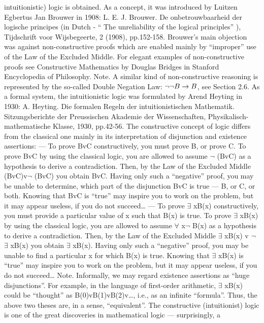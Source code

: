 intuitionistic) logic is obtained. As a concept, it was introduced by Luitzen Egbertus Jan Brouwer in
1908:
L. E. J. Brouwer. De onbetrouwbaarheid der logische principes (in Dutch - `` The unreliability of the logical principles'' ),
Tijdschrift voor Wijsbegeerte, 2 (1908), pp.152-158.
Brouwer's main objection was against non-constructive proofs which are enabled mainly by ``improper''
use of the Law of the Excluded Middle.
For elegant examples of non-constructive proofs see Constructive Mathematics by Douglas Bridges in
Stanford Encyclopedia of Philosophy.
Note. A similar kind of non-constructive reasoning is represented by the so-called Double Negation Law:
\(\neg \neg B\rightarrow B\), see Section 2.6.
As a formal system, the intuitionistic logic was formulated by Arend Heyting in 1930:
A. Heyting. Die formalen Regeln der intuitionistischen Mathematik. Sitzungsberichte der Preussischen Akademie der
Wissenschaften, Physikalisch-mathematische Klasse, 1930, pp.42-56.
The constructive concept of logic differs from the classical one mainly in its interpretation of disjunction
and existence assertions:
--- To prove BvC constructively, you must prove B, or prove C. To prove BvC by using the classical logic,
you are allowed to assume \(\neg\) (BvC) as a hypothesis to derive a contradiction. Then, by the Law of the
Excluded Middle (BvC)v\(\neg\) (BvC) you obtain BvC. Having only such a ``negative'' proof, you may be
unable to determine, which part of the disjunction BvC is true --- B, or C, or both. Knowing that BvC is
``true'' may inspire you to work on the problem, but it may appear useless, if you do not succeed\ldots 
--- To prove \(\exists\) xB(x) constructively, you must provide a particular value of x such that B(x) is true. To
prove \(\exists\) xB(x) by using the classical logic, you are allowed to assume \(\forall\) x\(\neg\) B(x) as a hypothesis to derive a
contradiction. Then, by the Law of the Excluded Middle \(\exists\) xB(x) v \(\neg\) \(\exists\) xB(x) you obtain \(\exists\) xB(x). Having
only such a ``negative'' proof, you may be unable to find a particular x for which B(x) is true. Knowing
that \(\exists\) xB(x) is ``true'' may inspire you to work on the problem, but it may appear useless, if you do not
succeed\ldots 
Note. Informally, we may regard existence assertions as ``huge disjunctions''. For example, in the
language of first-order arithmetic, \(\exists\) xB(x) could be ``thought'' as B(0)vB(1)vB(2)v\ldots , i.e., as an infinite
``formula''. Thus, the above two theses are, in a sense, ``equivalent''.
The constructive (intuitionist) logic is one of the great discoveries in mathematical logic --- surprisingly, a
